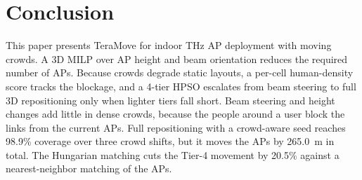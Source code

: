 \documentclass[conference]{IEEEtran}
\begin{document}
	\section{Conclusion}

	This paper presents TeraMove for indoor THz AP deployment with moving crowds. A 3D MILP over AP height and beam orientation reduces the required number of APs. Because crowds degrade static layouts, a per-cell human-density score tracks the blockage, and a 4-tier HPSO escalates from beam steering to full 3D repositioning only when lighter tiers fall short. Beam steering and height changes add little in dense crowds, because the people around a user block the links from the current APs. Full repositioning with a crowd-aware seed reaches 98.9\% coverage over three crowd shifts, but it moves the APs by 265.0~m in total. The Hungarian matching cuts the Tier-4 movement by 20.5\% against a nearest-neighbor matching of the APs.
\end{document}
